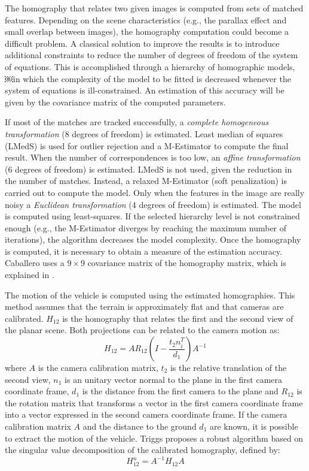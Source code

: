 The homography that relates two given images is computed from sets of matched features.
Depending on the scene characteristics (e.g., the parallax effect and small overlap between images), the homography computation could become a difficult problem. 
A classical solution to improve the results is to introduce additional constraints to reduce the number of degrees of freedom of the system of equations.
This is accomplished through a hierarchy of homographic models, ￼in which the complexity of the model to be fitted is decreased whenever the system of equations is ill-constrained.
An estimation of this accuracy will be given by the covariance matrix of the computed parameters.

If most of the matches are tracked successfully, a \textit{complete homogeneous transformation} (8 degrees of freedom) is estimated.
Least median of squares (LMedS) is used for outlier rejection and a M-Estimator  \cite{zhang1997parameter} to compute the final result.
When the number of correspondences is too low, an \textit{affine transformation} (6 degrees of freedom) is estimated.
LMedS is not used, given the reduction in the number of matches.
Instead, a relaxed M-Estimator (soft penalization) is carried out to compute the model.
Only when the features in the image are really noisy a \textit{Euclidean transformation} (4 degrees of freedom) is estimated.
The model is computed using least-squares.
If the selected hierarchy level is not constrained enough (e.g., the M-Estimator diverges by reaching the maximum number of iterations), the algorithm decreases the model complexity.
Once the homography is computed, it is necessary to obtain a measure of the estimation accuracy.
Caballero uses a $9 \times 9$ covariance matrix of the homography matrix, which is explained in \cite{Hartley2004}.

The motion of the vehicle is computed using the estimated homographies.
This method assumes that the terrain is approximately flat and that cameras are calibrated.
$H_{12}$ is the homography that relates the first and the second view of the planar scene.
Both projections can be related to the camera motion as:
\begin{equation}
H_{12} = AR_{12}(I - \frac{t_2n_i^T}{d_1})A^{-1}
\end{equation}
where $A$ is the camera calibration matrix, $t_2$ is the relative translation of the second view, $n_1$ is an unitary vector normal to the plane in the first camera coordinate frame, $d_1$ is the distance from the first camera to the plane and $R_{12}$ is the rotation matrix that transforms a vector in the first camera coordinate frame into a vector expressed in the second camera coordinate frame.
If the camera calibration matrix $A$ and the distance to the ground $d_1$ are known, it is possible to extract the motion of the vehicle.
Triggs \cite{triggs1998autocalibration} proposes a robust algorithm based on the singular value decomposition of the calibrated homography, defined by:
\begin{equation}
H_{12}^{u} = A^{-1} H_{12} A
\end{equation}

